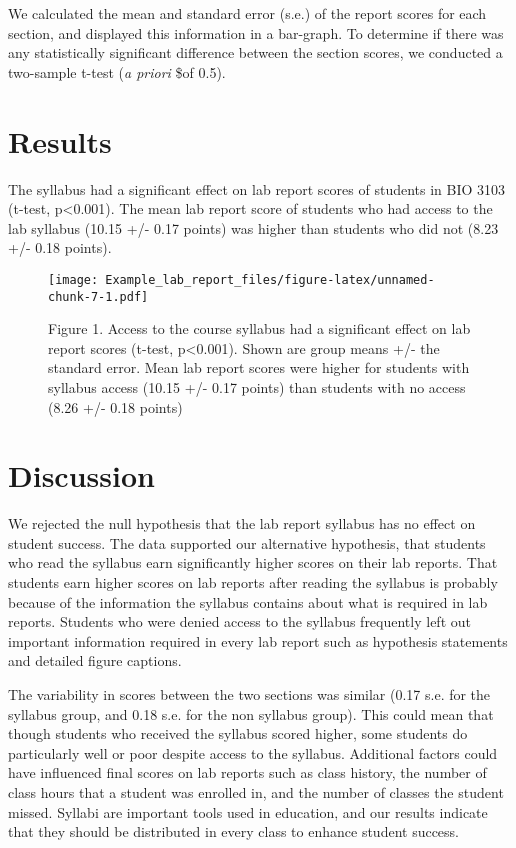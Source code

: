 \documentclass[]{article}
\begin{document}
We calculated the mean and standard error (s.e.) of the report scores
for each section, and displayed this information in a bar-graph. To
determine if there was any statistically significant difference between
the section scores, we conducted a two-sample t-test (\emph{a priori}
\$\alpha of 0.5).

\hypertarget{results}{%
\section{Results}\label{results}}

The syllabus had a significant effect on lab report scores of students
in BIO 3103 (t-test, p\textless{}0.001). The mean lab report score of
students who had access to the lab syllabus (10.15 +/- 0.17 points) was
higher than students who did not (8.23 +/- 0.18 points).

\begin{figure}
\centering
\texttt{[image: Example\_lab\_report\_files/figure-latex/unnamed-chunk-7-1.pdf]}
\caption{Figure 1. Access to the course syllabus had a significant
effect on lab report scores (t-test, p\textless{}0.001). Shown are group
means +/- the standard error. Mean lab report scores were higher for
students with syllabus access (10.15 +/- 0.17 points) than students with
no access (8.26 +/- 0.18 points)}
\end{figure}

\hypertarget{discussion}{%
\section{Discussion}\label{discussion}}

We rejected the null hypothesis that the lab report syllabus has no
effect on student success. The data supported our alternative
hypothesis, that students who read the syllabus earn significantly
higher scores on their lab reports. That students earn higher scores on
lab reports after reading the syllabus is probably because of the
information the syllabus contains about what is required in lab reports.
Students who were denied access to the syllabus frequently left out
important information required in every lab report such as hypothesis
statements and detailed figure captions.

The variability in scores between the two sections was similar (0.17
s.e. for the syllabus group, and 0.18 s.e. for the non syllabus group).
This could mean that though students who received the syllabus scored
higher, some students do particularly well or poor despite access to the
syllabus. Additional factors could have influenced final scores on lab
reports such as class history, the number of class hours that a student
was enrolled in, and the number of classes the student missed. Syllabi
are important tools used in education, and our results indicate that
they should be distributed in every class to enhance student success.
\end{document}
